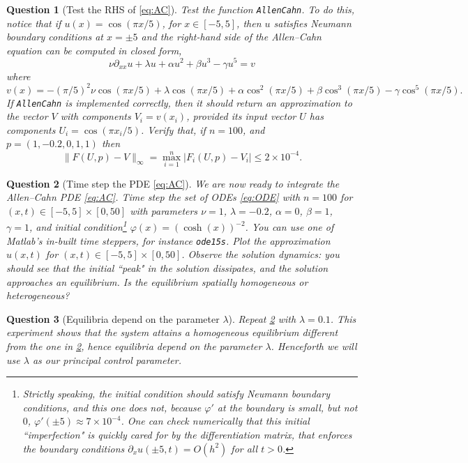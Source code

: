 \documentclass[a4paper]{siamart220329}
\theoremstyle{plain}
\newtheorem{question}{Question}
\begin{document}
\begin{question}[Test the RHS of \cref{eq:AC}] Test the function \lstinline|AllenCahn|. To do this,
notice that if $u(x) = \cos(\pi x/ 5)$, for $x \in [-5,5]$, then $u$ satisfies
Neumann boundary conditions at $x=\pm 5$ and the right-hand side
of the Allen--Cahn equation can be computed in closed form, 
\[
\nu \partial_{x x} u + \lambda u + \alpha u^2 + \beta u^3 - \gamma u^5 = v 
\]
where
\[
  v(x) = -(\pi / 5)^2\nu  \cos(\pi x / 5) + \lambda \cos(\pi x/ 5) + \alpha \cos^2(\pi
  x / 5) + \beta \cos^3(\pi x /5) - \gamma \cos^5(\pi x /5).
\]
If \lstinline|AllenCahn| is implemented correctly, then it should return an
approximation to the vector $V$ with components $V_i = v(x_i)$, provided its
input vector $U$ has components $U_i = \cos(\pi x_i/ 5)$.
%
Verify that, if $n=100$, and $p = (1,-0.2,0,1,1)$ then
\[
  \| F(U,p) - V \|_\infty = \max_{i=1}^n | F_i(U,p) - V_i | \leq 2 \times 10^{-4}.
\]
\end{question}

\begin{question}[Time step the PDE \cref{eq:AC}] \label{question:timeStep}
  We are now ready to
integrate the Allen--Cahn PDE \cref{eq:AC}. Time step the set of ODEs \cref{eq:ODE}
with $n=100$ for $(x,t) \in [-5,5] \times [0,50]$ with parameters 
$\nu = 1$, $\lambda =-0.2$, $\alpha=0$, $\beta=1$, $\gamma=1$, and initial
condition\footnote{Strictly speaking, the initial condition should satisfy Neumann
boundary conditions, and this one does not, because $\varphi'$ at the boundary is small,
but not $0$, $\varphi'(\pm 5)\approx 7 \times 10^{-4}$. One can check numerically that this
initial ``imperfection" is quickly cared for by the differentiation matrix, that
enforces the boundary conditions $\partial_x u(\pm 5,t)=O(h^2)$ for all $t>0$.}
$\varphi(x) = (\cosh(x))^{-2}$. You can use one of Matlab's in-built time steppers,
for instance \lstinline|ode15s|. Plot the approximation $u(x,t)$ for $(x,t) \in
[-5,5]\times [0,50]$. Observe the solution dynamics: you should see that the initial
``peak" in the solution dissipates, and the solution approaches an equilibrium. Is
the equilibrium spatially homogeneous or heterogeneous?
\end{question}

\begin{question}[Equilibria depend on the parameter $\lambda$] Repeat
\cref{question:timeStep} with $\lambda = 0.1$. This experiment shows that the system attains a
homogeneous equilibrium different from the one in \cref{question:timeStep}, hence equilibria depend
on the parameter $\lambda$. Henceforth we will use $\lambda$ as our principal control
parameter.
\end{question}
\end{document}
